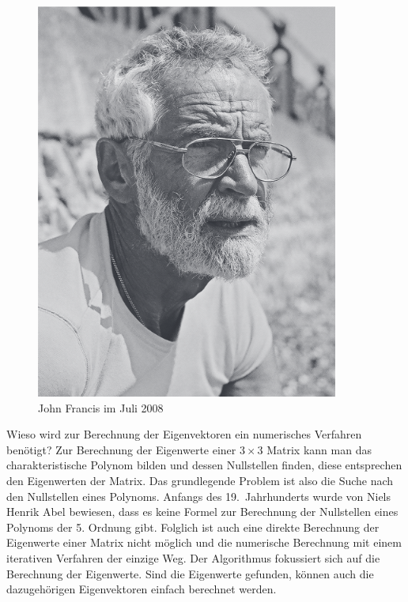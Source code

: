 \begin{refsection}
\begin{figure}[h]
	\begin{center}
		\includegraphics[scale=0.5]{papers/francis/images/Francis.png}
		\caption{John Francis im Juli 2008 \cite{francis:francis_portrait}}
		\label{John Francis}
	\end{center}
\end{figure}


Wieso wird zur Berechnung der Eigenvektoren ein numerisches Verfahren benötigt?
Zur Berechnung der Eigenwerte einer $3 \times 3$ Matrix kann man das charakteristische Polynom bilden und dessen Nullstellen finden, diese entsprechen den Eigenwerten der Matrix.
%
Das grundlegende Problem ist also die Suche nach den Nullstellen eines Polynoms.
Anfangs des 19.~Jahrhunderts wurde von Niels Henrik Abel bewiesen, dass es keine Formel zur Berechnung der Nullstellen eines Polynoms der 5. Ordnung gibt.
%
Folglich ist auch eine direkte Berechnung der Eigenwerte einer Matrix nicht möglich und die numerische Berechnung mit einem iterativen Verfahren der einzige Weg.
Der Algorithmus fokussiert sich auf die Berechnung der Eigenwerte.
Sind die Eigenwerte gefunden, können auch die dazugehörigen Eigenvektoren einfach berechnet werden.







\printbibliography[heading=subbibliography]
\end{refsection}
